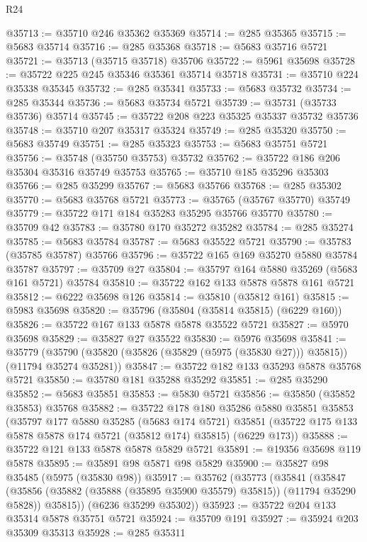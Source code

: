 \begin{lexlean}{R24}
\begin{coremodule}
@35713 := @35710 @246 @35362 @35369
@35714 := @285 @35365
@35715 := @5683 @35714
@35716 := @285 @35368
@35718 := @5683 @35716 @5721
@35721 := @35713 (@35715 @35718) @35706
@35722 := @5961 @35698
@35728 := @35722 @225 @245 @35346 @35361 @35714 @35718
@35731 := @35710 @224 @35338 @35345
@35732 := @285 @35341
@35733 := @5683 @35732
@35734 := @285 @35344
@35736 := @5683 @35734 @5721
@35739 := @35731 (@35733 @35736) @35714
@35745 := @35722 @208 @223 @35325 @35337 @35732 @35736
@35748 := @35710 @207 @35317 @35324
@35749 := @285 @35320
@35750 := @5683 @35749
@35751 := @285 @35323
@35753 := @5683 @35751 @5721
@35756 := @35748 (@35750 @35753) @35732
@35762 := @35722 @186 @206 @35304 @35316 @35749 @35753
@35765 := @35710 @185 @35296 @35303
@35766 := @285 @35299
@35767 := @5683 @35766
@35768 := @285 @35302
@35770 := @5683 @35768 @5721
@35773 := @35765 (@35767 @35770) @35749
@35779 := @35722 @171 @184 @35283 @35295 @35766 @35770
@35780 := @35709 @42
@35783 := @35780 @170 @35272 @35282
@35784 := @285 @35274
@35785 := @5683 @35784
@35787 := @5683 @35522 @5721
@35790 := @35783 (@35785 @35787) @35766
@35796 := @35722 @165 @169 @35270 @5880 @35784 @35787
@35797 := @35709 @27
@35804 := @35797 @164 @5880 @35269 (@5683 @161 @5721) @35784
@35810 := @35722 @162 @133 @5878 @5878 @161 @5721
@35812 := @6222 @35698 @126
@35814 := @35810 (@35812 @161)
@35815 := @5983 @35698
@35820 := @35796 (@35804 (@35814 @35815) (@6229 @160))
@35826 := @35722 @167 @133 @5878 @5878 @35522 @5721
@35827 := @5970 @35698
@35829 := @35827 @27 @35522
@35830 := @5976 @35698
@35841 := @35779
    (@35790 (@35820 (@35826 (@35829 (@5975 (@35830 @27))) @35815)) (@11794 @35274 @35281))
@35847 := @35722 @182 @133 @35293 @5878 @35768 @5721
@35850 := @35780 @181 @35288 @35292
@35851 := @285 @35290
@35852 := @5683 @35851
@35853 := @5830 @5721
@35856 := @35850 (@35852 @35853) @35768
@35882 := @35722
    @178
    @180
    @35286
    @5880
    @35851
    @35853
    (@35797
      @177
      @5880
      @35285
      (@5683 @174 @5721)
      @35851
      (@35722 @175 @133 @5878 @5878 @174 @5721 (@35812 @174) @35815)
      (@6229 @173))
@35888 := @35722 @121 @133 @5878 @5878 @5829 @5721
@35891 := @19356 @35698 @119 @5878
@35895 := @35891 @98 @5871 @98 @5829
@35900 := @35827 @98 @35485 (@5975 (@35830 @98))
@35917 := @35762
    (@35773
      (@35841
        (@35847
          (@35856 (@35882 (@35888 (@35895 @35900 @35579) @35815)) (@11794 @35290 @5828))
          @35815))
      (@6236 @35299 @35302))
@35923 := @35722 @204 @133 @35314 @5878 @35751 @5721
@35924 := @35709 @191
@35927 := @35924 @203 @35309 @35313
@35928 := @285 @35311

\end{coremodule}
\end{lexlean}
